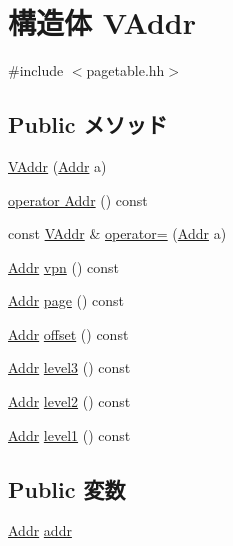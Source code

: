 \hypertarget{structAlphaISA_1_1VAddr}{
\section{構造体 VAddr}
\label{structAlphaISA_1_1VAddr}
}


{\ttfamily \#include $<$pagetable.hh$>$}\subsection*{Public メソッド}
\begin{DoxyCompactItemize}
\item 
\hyperlink{structAlphaISA_1_1VAddr_aea4be566b2249d0b69dcee270c8b461d}{VAddr} (\hyperlink{classm5_1_1params_1_1Addr}{Addr} a)
\item 
\hyperlink{structAlphaISA_1_1VAddr_acb58a2b913b1ee45cf52ff8a6f5297c5}{operator Addr} () const 
\item 
const \hyperlink{structAlphaISA_1_1VAddr}{VAddr} \& \hyperlink{structAlphaISA_1_1VAddr_a7a4215209d20e18c277206574eb1a86e}{operator=} (\hyperlink{classm5_1_1params_1_1Addr}{Addr} a)
\item 
\hyperlink{classm5_1_1params_1_1Addr}{Addr} \hyperlink{structAlphaISA_1_1VAddr_ab81a86f36291439a60bf57c10ae767f4}{vpn} () const 
\item 
\hyperlink{classm5_1_1params_1_1Addr}{Addr} \hyperlink{structAlphaISA_1_1VAddr_a0a2c0c43cd466cb2730c9387a7061a2b}{page} () const 
\item 
\hyperlink{classm5_1_1params_1_1Addr}{Addr} \hyperlink{structAlphaISA_1_1VAddr_ad7614ecd306d0a915379cd6fae8b02de}{offset} () const 
\item 
\hyperlink{classm5_1_1params_1_1Addr}{Addr} \hyperlink{structAlphaISA_1_1VAddr_a4ea534e4bdbdfebe2d82eddb86284b5d}{level3} () const 
\item 
\hyperlink{classm5_1_1params_1_1Addr}{Addr} \hyperlink{structAlphaISA_1_1VAddr_a5fb0a2faeaa59b4d186256f71f494020}{level2} () const 
\item 
\hyperlink{classm5_1_1params_1_1Addr}{Addr} \hyperlink{structAlphaISA_1_1VAddr_a6fac2640aa06dbd7e9cf8af5b81f8969}{level1} () const 
\end{DoxyCompactItemize}
\subsection*{Public 変数}
\begin{DoxyCompactItemize}
\item 
\hyperlink{classm5_1_1params_1_1Addr}{Addr} \hyperlink{structAlphaISA_1_1VAddr_a0bb77b4ba61e408313e1118250f9278c}{addr}
\end{DoxyCompactItemize}
